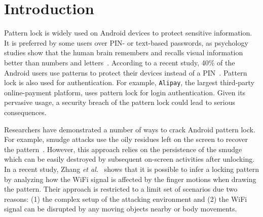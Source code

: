 \section{Introduction\label{sec:intro}}


Pattern lock is widely used on Android devices to protect sensitive information. It is preferred by some users over PIN- or text-based
passwords, as psychology studies show that the human brain remembers and
recalls visual information better than numbers and
letters~\cite{DeAngeli:2005:PRW:1090412.1090419}.
According to a recent study, 40\% of the Android users
use patterns to protect their devices instead of a PIN~\cite{androidstudy}.
Pattern lock is also used for authentication. For example, \texttt{Alipay}, the largest
third-party online-payment platform, uses pattern lock for login authentication.
Given its pervasive usage, a security breach of the pattern lock could lead to serious consequences.


Researchers have demonstrated a number of ways to crack Android pattern lock.
For example, smudge attacks use the oily residues  left on the screen to recover
the pattern~\cite{aviv2010smudge}. However, this approach relies on the persistence of
the smudge which can be easily destroyed by subsequent on-screen activities after unlocking. In a recent study, Zhang
\emph{et al.}~\cite{zhang2016privacy} shows that it is possible to infer a locking pattern by analyzing how the WiFi signal is affected by the finger motions when drawing the pattern. Their approach is restricted to
a limit set of scenarios due two reasons: (1) the complex setup of the attacking environment and (2) the WiFi signal can be disrupted by any moving
objects nearby or body movements.


